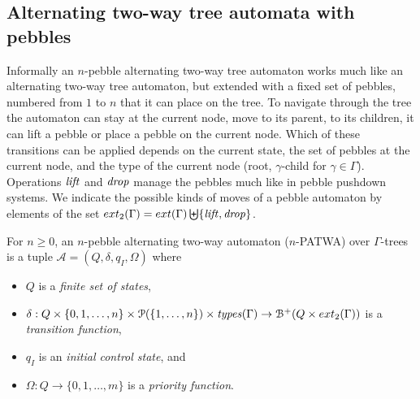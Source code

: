 \documentclass[a4paper,UKenglish,cleveref, autoref, thm-restate]{lipics-v2021}
\begin{document}
\subsection{Alternating two-way tree automata with pebbles}

Informally an $n$-pebble alternating two-way tree automaton works much like an alternating two-way tree automaton, but extended with a fixed set of pebbles, numbered from $1$ to $n$ that it can place on the tree. 
To navigate through the tree the automaton can stay at the current node, move to its parent, to its 
 children, it can lift a pebble or place a pebble on the current node.
 Which of these transitions can be applied depends on the current state, the set
 of pebbles at the current node, 
and the type of the current node (root, $\gamma$-child for $\gamma \in \Gamma$). 
Operations $\text{\textit{lift}}$ and $\text{\textit{drop}}$ manage the
pebbles much like in pebble pushdown systems.
We indicate the possible kinds of moves of a pebble automaton by elements of the set 
$ext_2(\Gamma) = ext(\Gamma) \biguplus \{ \text{\textit{lift}}, \text{\textit{drop}}\}$.

\begin{samepage}
\begin{definition}
For $n\geq 0$, an $n$-pebble alternating two-way automaton ($n$-PATWA) over  
$\Gamma$-trees is a tuple
$\mathcal{A} = (Q,   
\delta , q_I , 
\Omega)$ where
\begin{itemize}
\item $Q$ is a {\em finite set of states},
\item $\delta  : Q  \times \{ 0, 1, \ldots, n\} \times \mathcal{P}(\{ 1, \ldots, n\}) \times 
\text{\textit{types}}(\Gamma)
  \to  \mathcal{B}^+ (Q \times ext_2(\Gamma))$ is a {\em transition function},
\item $q_I$ is an {\em initial control state}, and
\item $\Omega : Q \to \{ 0, 1, \ldots, m\}$ is a {\em priority function}.
\end{itemize}
\end{definition}
\end{samepage}
 
\end{document}
